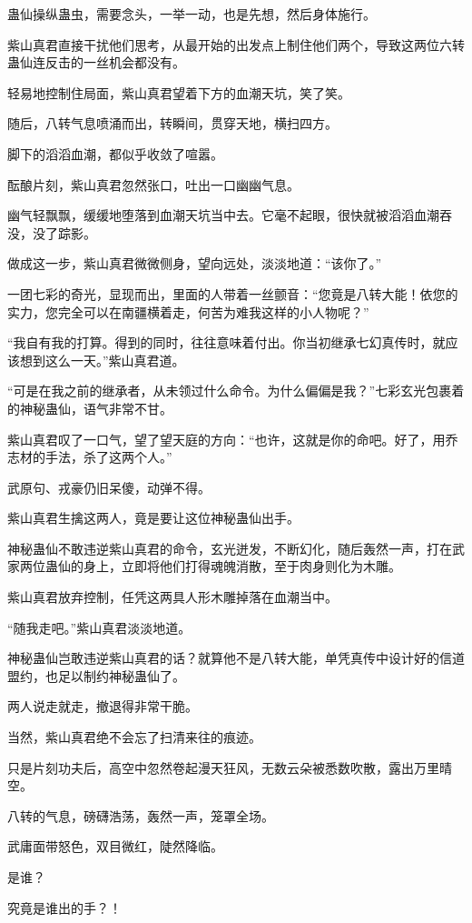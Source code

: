 \begin{this_body}
蛊仙操纵蛊虫，需要念头，一举一动，也是先想，然后身体施行。

紫山真君直接干扰他们思考，从最开始的出发点上制住他们两个，导致这两位六转蛊仙连反击的一丝机会都没有。

轻易地控制住局面，紫山真君望着下方的血潮天坑，笑了笑。

随后，八转气息喷涌而出，转瞬间，贯穿天地，横扫四方。

脚下的滔滔血潮，都似乎收敛了喧嚣。

酝酿片刻，紫山真君忽然张口，吐出一口幽幽气息。

幽气轻飘飘，缓缓地堕落到血潮天坑当中去。它毫不起眼，很快就被滔滔血潮吞没，没了踪影。

做成这一步，紫山真君微微侧身，望向远处，淡淡地道：“该你了。”

一团七彩的奇光，显现而出，里面的人带着一丝颤音：“您竟是八转大能！依您的实力，您完全可以在南疆横着走，何苦为难我这样的小人物呢？”

“我自有我的打算。得到的同时，往往意味着付出。你当初继承七幻真传时，就应该想到这么一天。”紫山真君道。

“可是在我之前的继承者，从未领过什么命令。为什么偏偏是我？”七彩玄光包裹着的神秘蛊仙，语气非常不甘。

紫山真君叹了一口气，望了望天庭的方向：“也许，这就是你的命吧。好了，用乔志材的手法，杀了这两个人。”

武原句、戎豪仍旧呆傻，动弹不得。

紫山真君生擒这两人，竟是要让这位神秘蛊仙出手。

神秘蛊仙不敢违逆紫山真君的命令，玄光迸发，不断幻化，随后轰然一声，打在武家两位蛊仙的身上，立即将他们打得魂魄消散，至于肉身则化为木雕。

紫山真君放弃控制，任凭这两具人形木雕掉落在血潮当中。

“随我走吧。”紫山真君淡淡地道。

神秘蛊仙岂敢违逆紫山真君的话？就算他不是八转大能，单凭真传中设计好的信道盟约，也足以制约神秘蛊仙了。

两人说走就走，撤退得非常干脆。

当然，紫山真君绝不会忘了扫清来往的痕迹。

只是片刻功夫后，高空中忽然卷起漫天狂风，无数云朵被悉数吹散，露出万里晴空。

八转的气息，磅礴浩荡，轰然一声，笼罩全场。

武庸面带怒色，双目微红，陡然降临。

是谁？

究竟是谁出的手？！


\end{this_body}
